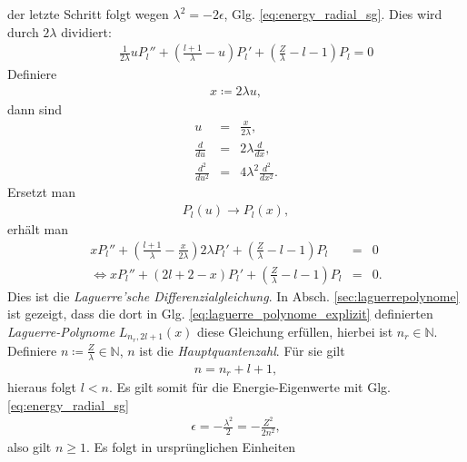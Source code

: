 \documentclass{book}
\begin{document}
%
der letzte Schritt folgt wegen $\lambda^2 = -2\epsilon$, Glg. \eqref{eq:energy_radial_sg}. Dies wird durch $2\lambda$ dividiert:
%
\begin{eqnarray}
&&\frac{1}{2\lambda}uP_l'' + \left(\frac{l + 1}{\lambda} - u\right)P_l' + \left(\frac{Z}{\lambda} - l - 1\right)P_l = 0
\end{eqnarray}
%
Definiere
%
\begin{eqnarray}
x \coloneqq 2\lambda u, 
\end{eqnarray}
%
dann sind
%
\begin{eqnarray}
u & = & \frac{x}{2\lambda},\\
\frac{d}{du} & = & 2\lambda\frac{d}{dx},\\
\frac{d^2}{du^2} & = & 4\lambda^2\frac{d^2}{dx^2}.
\end{eqnarray}
%
Ersetzt man
%
\begin{eqnarray}
P_l\left(u\right)\to P_l\left(x\right), 
\end{eqnarray}
%
erhält man
%
\begin{eqnarray}
xP_l'' + \left(\frac{l + 1}{\lambda} - \frac{x}{2\lambda}\right)2\lambda P_l' + \left(\frac{Z}{\lambda} - l - 1\right)P_l & = & 0\nonumber\\
\Leftrightarrow xP_l'' + \left(2l + 2 - x\right)P_l' + \left(\frac{Z}{\lambda} - l - 1\right)P_l & = & 0.
\end{eqnarray}
%
Dies ist die \textit{Laguerre'sche Differenzialgleichung}. In Absch. \ref{sec:laguerrepolynome} ist gezeigt, dass die dort in Glg. \eqref{eq:laguerre_polynome_explizit} definierten \textit{Laguerre-Polynome} $L_{n_r, 2l + 1}\left(x\right)$ diese Gleichung erfüllen, hierbei ist $n_r\in\mathbb{N}$. Definiere $n \coloneqq \frac{Z}{\lambda}\in\mathbb{N}$, $n$ ist die \textit{Hauptquantenzahl}. Für sie gilt
%
\begin{eqnarray}
n = n_r + l + 1, 
\end{eqnarray}
%
hieraus folgt $l<n$. Es gilt somit für die Energie-Eigenwerte mit Glg. \eqref{eq:energy_radial_sg}
%
\begin{eqnarray}
\epsilon = -\frac{\lambda^2}{2} = -\frac{Z^2}{2n^2}, 
\end{eqnarray}
%
also gilt $n\geq1$. Es folgt in ursprünglichen Einheiten
%
\begin{center}
\end{center}
\end{document}
